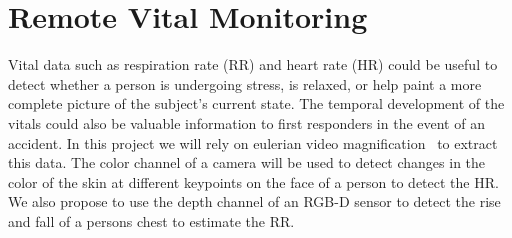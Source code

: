 





\section{Remote Vital Monitoring}

Vital data such as respiration rate (RR) and heart rate (HR) could be useful to detect whether a person is undergoing stress, is relaxed, or help paint a more complete picture of the subject's current state. The temporal development of the vitals could also be valuable information to first responders in the event of an accident.
In this project we will rely on eulerian video magnification~\cite{Wu12Eulerian} to extract this data. The color channel of a camera will be used to detect changes in the color of the skin at different keypoints on the face of a person to detect the HR.
We also propose to use the depth channel of an RGB-D sensor to detect the rise and fall of a persons chest to estimate the RR.

